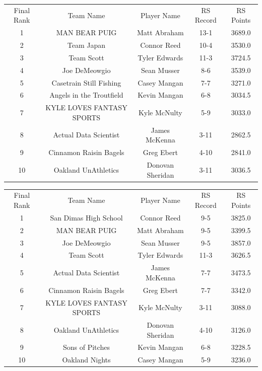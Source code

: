 \documentclass[11pt,letterpaper]{article}
\begin{document}
\newpage
{}
\vspace{-25pt}
\begin{table} [h]
\begin{center}
\begin{tabular} { c c c c c }
\\ Final Rank & Team Name & Player Name & RS Record & RS Points
\\ 1  & MAN BEAR PUIG  & Matt Abraham & 13-1 & 3689.0
\\ 2  & Team Japan & Connor Reed & 10-4 & 3530.0
\\ 3  & Team Scott & Tyler Edwards & 11-3 & 3724.5
\\ 4  & Joe DeMeowgio & Sean Musser & 8-6  & 3539.0
\\ 5  & Casetrain Still Fishing & Casey Mangan & 7-7 & 3271.0
\\ 6  & Angels in the Troutfield & Kevin Mangan & 6-8 & 3034.5
\\ 7  & KYLE LOVES FANTASY SPORTS & Kyle McNulty & 5-9 & 3033.0
\\ 8  & Actual Data Scientist & James McKenna & 3-11 & 2862.5
\\ 9  & Cinnamon Raisin Bagels & Greg Ebert & 4-10 & 2841.0
\\ 10  & Oakland UnAthletics  & Donovan Sheridan & 3-11  & 3036.5
\end{tabular}
\end{center}
\end{table}

\vspace{-25pt}
\begin{table} [h]
\begin{center}
\begin{tabular} { c c c c c }
\\ Final Rank & Team Name & Player Name & RS Record & RS Points
\\ 1  & San Dimas High School & Connor Reed & 9-5 & 3825.0
\\ 2  & MAN BEAR PUIG  & Matt Abraham & 9-5 & 3399.5
\\ 3  & Joe DeMeowgio & Sean Musser & 9-5 & 3857.0
\\ 4  & Team Scott & Tyler Edwards & 11-3 & 3626.5
\\ 5  & Actual Data Scientist & James McKenna & 7-7 & 3473.5
\\ 6  & Cinnamon Raisin Bagels & Greg Ebert & 7-7 & 3342.0
\\ 7  & KYLE LOVES FANTASY SPORTS & Kyle McNulty & 3-11 & 3088.0
\\ 8  & Oakland UnAthletics & Donovan Sheridan & 4-10 & 3126.0
\\ 9  & Sons of Pitches & Kevin Mangan & 6-8 & 3228.5
\\ 10  & Oakland Nights & Casey Mangan & 5-9 & 3236.0
\end{tabular}
\end{center}
\end{table}
\end{document}

